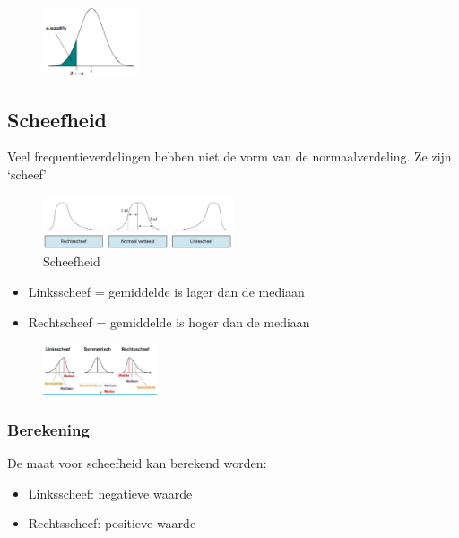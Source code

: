 \documentclass{article}
\begin{document}
\begin{figure}[H]
    \centering
    \includegraphics[width=0.25\textwidth]{z-score-nut.png}
    \caption{}
\end{figure}

\subsection{Scheefheid}

Veel frequentieverdelingen hebben niet de vorm van de normaalverdeling. Ze zijn `scheef'

\begin{figure}[H]
    \centering
    \includegraphics[width=0.5\textwidth]{scheefheid.png}
    \caption{Scheefheid}
\end{figure}

\begin{itemize}
    \item Linksscheef = gemiddelde is lager dan de mediaan
    \item Rechtscheef = gemiddelde is hoger dan de mediaan
\end{itemize}

\begin{figure}[H]
    \centering
    \includegraphics[width=0.3\textwidth]{scheefheid2.png}
    \caption{}
\end{figure}

\subsubsection{Berekening}

De maat voor scheefheid kan berekend worden:

\begin{itemize}
    \item Linksscheef: negatieve waarde
    \item Rechtsscheef: positieve waarde
\end{itemize}
\end{document}
